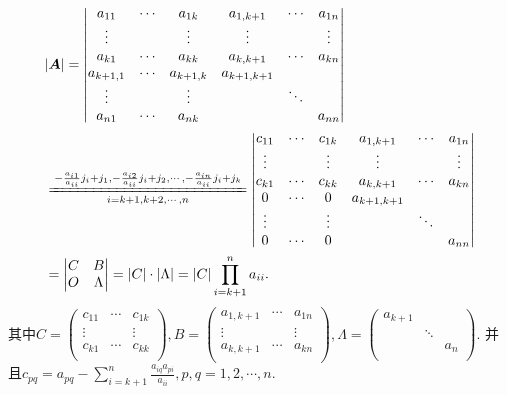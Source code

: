 \documentclass[../../main.tex]{subfiles}
\begin{document}
\begin{solution}
\begin{align*}
&|\boldsymbol{A}|=\left| \begin{matrix}
a_{11}&		\cdots&		a_{1k}&		a_{1,k+1}&		\cdots&		a_{1n}\\
\vdots&		&		\vdots&		\vdots&		&		\vdots\\
a_{k1}&		\cdots&		a_{kk}&		a_{k,k+1}&		\cdots&		a_{kn}\\
a_{k+1,1}&		\cdots&		a_{k+1,k}&		a_{k+1,k+1}&		&		\\
\vdots&		&		\vdots&		&		\ddots&		\\
a_{n1}&		\cdots&		a_{nk}&		&		&		a_{nn}\\
\end{matrix} \right|
\\
&\xlongequal[i=k+1,k+2,\cdots ,n]{-\frac{a_{i1}}{a_{ii}}j_i+j_1,-\frac{a_{i2}}{a_{ii}}j_i+j_2,\cdots ,-\frac{a_{in}}{a_{ii}}j_i+j_k}\left| \begin{matrix}
c_{11}&		\cdots&		c_{1k}&		a_{1,k+1}&		\cdots&		a_{1n}\\
\vdots&		&		\vdots&		\vdots&		&		\vdots\\
c_{k1}&		\cdots&		c_{kk}&		a_{k,k+1}&		\cdots&		a_{kn}\\
0&		\cdots&		0&		a_{k+1,k+1}&		&		\\
\vdots&		&		\vdots&		&		\ddots&		\\
0&		\cdots&		0&		&		&		a_{nn}\\
\end{matrix} \right|
\\
&=\left| \begin{matrix}
C&		B\\
O&		\Lambda\\
\end{matrix} \right|=|C|\cdot |\Lambda |=|C|\prod_{i=k+1}^n{a_{ii}}.
\end{align*}
其中$C=\left( \begin{matrix}
c_{11}&		\cdots&		c_{1k}\\
\vdots&		&		\vdots\\
c_{k1}&		\cdots&		c_{kk}\\
\end{matrix} \right) ,B=\left( \begin{matrix}
a_{1,k+1}&		\cdots&		a_{1n}\\
\vdots&		&		\vdots\\
a_{k,k+1}&		\cdots&		a_{kn}\\
\end{matrix} \right) ,\Lambda =\left( \begin{matrix}
a_{k+1}&		&		\\
&		\ddots&		\\
&		&		a_n\\
\end{matrix} \right).$
并且$c_{pq}=a_{pq}-\sum_{i=k+1}^n{\frac{a_{iq}a_{pi}}{a_{ii}}},p,q=1,2,\cdots ,n$.
\end{solution}
\end{document}
